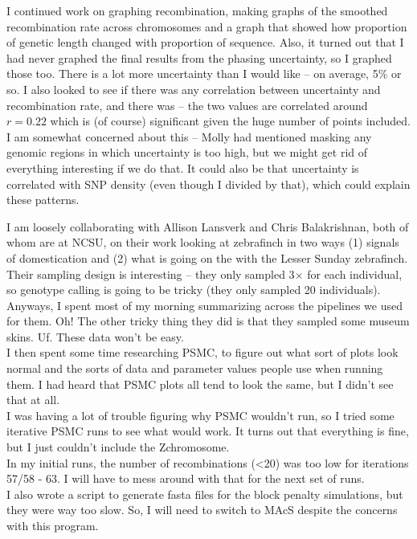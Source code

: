 \documentclass[idxtotoc,hyperref,openany,oneside]{labbook} %
\begin{document}
I continued work on graphing recombination, making graphs of the smoothed recombination rate across chromosomes and a graph that showed how proportion of genetic length changed with proportion of sequence. Also, it turned out that I had never graphed the final results from the phasing uncertainty, so I graphed those too. There is a lot more uncertainty than I would like -- on average, 5\% or so. I also looked to see if there was any correlation between uncertainty and recombination rate, and there was -- the two values are correlated around $r=0.22$ which is (of course) significant given the huge number of points included. I am somewhat concerned about this -- Molly had mentioned masking any genomic regions in which uncertainty is too high, but we might get rid of everything interesting if we do that. It could also be that uncertainty is correlated with SNP density (even though I divided by that), which could explain these patterns.

I am loosely collaborating with Allison Lansverk and Chris Balakrishnan, both of whom are at NCSU, on their work looking at zebrafinch in two ways (1) signals of domestication and (2) what is going on the with the Lesser Sunday zebrafinch. Their sampling design is interesting -- they only sampled 3$\times$ for each individual, so genotype calling is going to be tricky (they only sampled 20 individuals). Anyways, I spent most of my morning summarizing across the pipelines we used for them. Oh! The other tricky thing they did is that they sampled some museum skins. Uf. These data won't be easy. \\

I then spent some time researching PSMC, to figure out what sort of plots look normal and the sorts of data and parameter values people use when running them. I had heard that PSMC plots all tend to look the same, but I didn't see that at all. \\

I was having a lot of trouble figuring why PSMC wouldn't run, so I tried some iterative PSMC runs to see what would work. It turns out that everything is fine, but I just couldn't include the Zchromosome. \\

In my initial runs, the number of recombinations (<20) was too low for iterations 57/58 - 63. I will have to mess around with that for the next set of runs. \\

I also wrote a script to generate fasta files for the block penalty simulations, but they were way too slow. So, I will need to switch to MAcS despite the concerns with this program.
\end{document}
